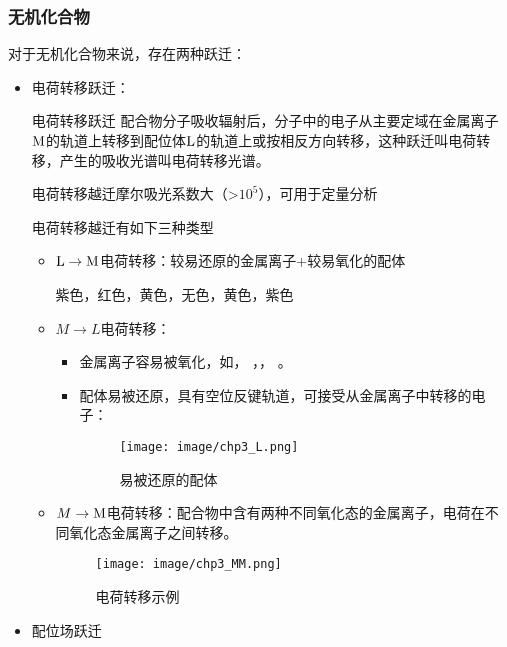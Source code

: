 \subsubsection*{无机化合物}
对于无机化合物来说，存在两种跃迁：
\begin{itemize}
    \item 电荷转移跃迁：
    \begin{definition*}{电荷转移跃迁}
        配合物分子吸收辐射后，分子中的电子从主要定域在金属离子$\ce{M}$的轨道上转移到配位体$\ce{L}$的轨道上或按相反方向转移，这种跃迁叫电荷转移，产生的吸收光谱叫电荷转移光谱。
    \end{definition*}
    \begin{note}
        电荷转移越迁摩尔吸光系数大（>$10^{5}$），可用于定量分析
    \end{note}
    电荷转移越迁有如下三种类型
    \begin{itemize}
        \item $\ce{L}\rightarrow \ce{M}$电荷转移：较易还原的金属离子+较易氧化的配体
        \begin{example}
             紫色，红色，黄色，无色，黄色，紫色
        \end{example}
        \item $M\rightarrow L$电荷转移：
        \begin{itemize}
            \item 金属离子容易被氧化，如， ，， 。
            \item 配体易被还原，具有空位反键轨道，可接受从金属离子中转移的电子：
            \begin{figure}[h]
                \centering
                \texttt{[image: image/chp3\_L.png]}
                \label{fig:chp3L}
                \caption{易被还原的配体}
            \end{figure}
        \end{itemize}
        \item $M\rightarrow \ce{M}$电荷转移：配合物中含有两种不同氧化态的金属离子，电荷在不同氧化态金属离子之间转移。
        \begin{figure}[h]
            \centering
            \texttt{[image: image/chp3\_MM.png]}
            \label{fig:chp3MM}
            \caption{电荷转移示例}
        \end{figure}
    \end{itemize}
    \item 配位场跃迁

\end{itemize}
